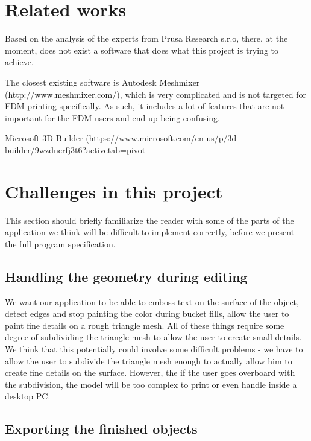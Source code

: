 \section{Related works}

Based on the analysis of the experts from Prusa Research s.r.o, there, at the moment, does not exist a software that does what this project is trying to achieve.

The closest existing software is Autodesk Meshmixer (http://www.meshmixer.com/), which is very complicated and is not targeted for FDM printing specifically. As such, it includes a lot of features that are not important for the FDM users and end up being confusing.

Microsoft 3D Builder (https://www.microsoft.com/en-us/p/3d-builder/9wzdncrfj3t6?activetab=pivot%

\section{Challenges in this project}

This section should briefly familiarize the reader with some of the parts of the application we think will be difficult to implement correctly, before we present the full program specification.

\subsection{Handling the geometry during editing}

We want our application to be able to emboss text on the surface of the object, detect edges and stop painting the color during bucket fills, allow the user to paint fine details on a rough triangle mesh. All of these things require some degree of subdividing the triangle mesh to allow the user to create small details. We think that this potentially could involve some difficult problems - we have to allow the user to subdivide the triangle mesh enough to actually allow him to create fine details on the surface. However, the if the user goes overboard with the subdivision, the model will be too complex to print or even handle inside a desktop PC.

\subsection{Exporting the finished objects}

